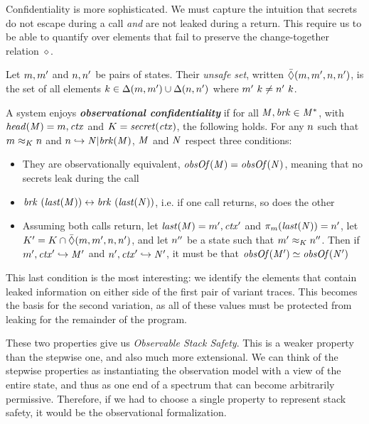 \documentclass[10pt,conference]{ieeetran}%
\theoremstyle{definition}
\begin{document}
{\medskip

Confidentiality is more sophisticated. We must capture the intuition that
secrets do not escape during a call {\em and} are not leaked during a return.
This require us to be able to quantify over elements that fail to preserve
the change-together relation \(\diamond\).

 Let \(m,m'\) and \(n,n'\)
be pairs of states. Their {\em unsafe set}, written
\(\bar{\Diamond}(m,m',n,n')\), is the set of all elements
\(k \in \Delta(m,m') \cup \Delta(n,n')\) where
\(m' ~ k \not = n' ~ k\).

A system enjoys \textbf{\em observational confidentiality} if for all
\(\mathit{M},\mathit{brk} \in \mathit{M}^*\), with \(\mathit{head}(\mathit{M}) = m,\mathit{ctx}\) and
\(K = \mathit{secret}(\mathit{ctx})\), the following holds.
%
For any \(n\) such that \(m \approx_K n\) and
\(n \hookrightarrow \mathit{N} | \mathit{brk}(\mathit{M})\),
\(\mathit{M}\) and \(\mathit{N}\) respect three conditions:

\begin{itemize}
\item They are observationally equivalent, \(\mathit{obsOf}(\mathit{M}) = \mathit{obsOf}(\mathit{N})\),
  meaning that no secrets leak during the call
\item \(\mathit{brk} ~ (\mathit{last}(\mathit{M})) \leftrightarrow \mathit{brk} ~
(\mathit{last}(\mathit{N}))\), i.e. if one call returns, so does the other
\item Assuming both calls return, let \(\mathit{last}(\mathit{M}) = m',\mathit{ctx}'\)
  and \(\pi_m(\mathit{last}(\mathit{N})) = n'\),
  let \(K' = K \cap \bar{\Diamond}(m,m',n,n')\),
  and let \(n''\) be a state such that \(m' \approx_K n''\).
  Then if \(m',\mathit{ctx}' \hookrightarrow \mathit{M}'\) and
  \(n',\mathit{ctx}' \hookrightarrow \mathit{N}'\), it must be
  that \(\mathit{obsOf}(\mathit{M}') \simeq \mathit{obsOf}(\mathit{N}')\)
\end{itemize}

This last condition is the most interesting: we identify the elements that
contain leaked information on either side of the first pair of variant traces.
This becomes the basis for the second variation, as all of these values
must be protected from leaking for the remainder of the program.

These two properties give us
{\em Observable Stack Safety}. This is a weaker property
than the stepwise one, and also much more extensional.
We can think of the stepwise properties as instantiating
the observation model with a view of the entire state, and
thus as one end of a spectrum that can become arbitrarily permissive.
Therefore, if we had to choose a single property to represent stack safety,
it would be the observational formalization.

}
\end{document}

